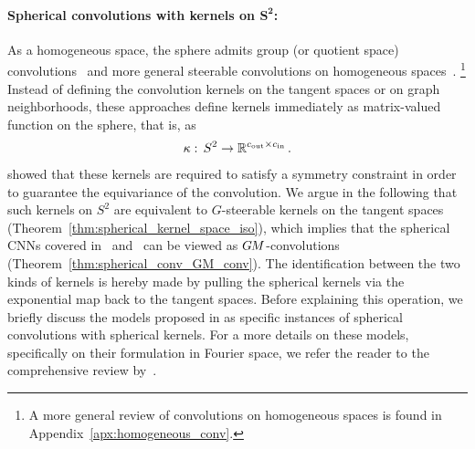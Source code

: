 \paragraph{Spherical convolutions with kernels on $\bm{S^2}$:}

As a homogeneous space, the sphere admits group (or quotient space) convolutions~\cite{Kondor2018-GENERAL} and more general steerable convolutions on homogeneous spaces~\cite{Cohen2019-generaltheory}.%
\footnote{
    A more general review of convolutions on homogeneous spaces is found in Appendix~\ref{apx:homogeneous_conv}.
}
Instead of defining the convolution kernels on the tangent spaces or on graph neighborhoods, these approaches define kernels immediately as matrix-valued function on the sphere, that is, as
\begin{align}\label{eq:spherical_kernel}
    \kappa:\, S^2 \to \mathbb{R}^{{c_\textup{out}}\times{c_\textup{in}}} \,.
\end{align}
\citet{Cohen2019-generaltheory} showed that these kernels are required to satisfy a symmetry constraint in order to guarantee the equivariance of the convolution.
We argue in the following that such kernels on $S^2$ are equivalent to $G$-steerable kernels on the tangent spaces (Theorem~\ref{thm:spherical_kernel_space_iso}), which implies that the spherical CNNs covered in~\cite{Cohen2019-generaltheory} and~\cite{Kondor2018-GENERAL} can be viewed as $G\mkern-1.4muM$-convolutions (Theorem~\ref{thm:spherical_conv_GM_conv}).
The identification between the two kinds of kernels is hereby made by pulling the spherical kernels via the exponential map back to the tangent spaces.
Before explaining this operation, we briefly discuss the models proposed in \cite{Cohen2018-S2CNN,esteves2018zonalSpherical,esteves2020spinweighted,kondor2018ClebschGordan} as specific instances of spherical convolutions with spherical kernels.
For a more details on these models, specifically on their formulation in Fourier space, we refer the reader to the comprehensive review by~\citet{esteves2020theoretical}.



